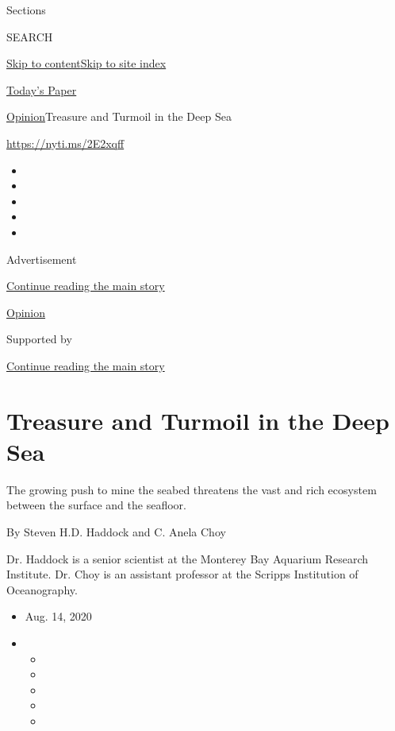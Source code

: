 Sections

SEARCH

\protect\hyperlink{site-content}{Skip to
content}\protect\hyperlink{site-index}{Skip to site index}

\href{https://myaccount.nytimes3xbfgragh.onion/auth/login?response_type=cookie\&client_id=vi}{}

\href{https://www.nytimes3xbfgragh.onion/section/todayspaper}{Today's
Paper}

\href{/section/opinion}{Opinion}\textbar{}Treasure and Turmoil in the
Deep Sea

\url{https://nyti.ms/2E2xqff}

\begin{itemize}
\item
\item
\item
\item
\item
\end{itemize}

Advertisement

\protect\hyperlink{after-top}{Continue reading the main story}

\href{/section/opinion}{Opinion}

Supported by

\protect\hyperlink{after-sponsor}{Continue reading the main story}

\hypertarget{treasure-and-turmoil-in-the-deep-sea}{%
\section{Treasure and Turmoil in the Deep
Sea}\label{treasure-and-turmoil-in-the-deep-sea}}

The growing push to mine the seabed threatens the vast and rich
ecosystem between the surface and the seafloor.

By Steven H.D. Haddock and C. Anela Choy

Dr. Haddock is a senior scientist at the Monterey Bay Aquarium Research
Institute. Dr. Choy is an assistant professor at the Scripps Institution
of Oceanography.

\begin{itemize}
\item
  Aug. 14, 2020
\item
  \begin{itemize}
  \item
  \item
  \item
  \item
  \item
  \end{itemize}
\end{itemize}

